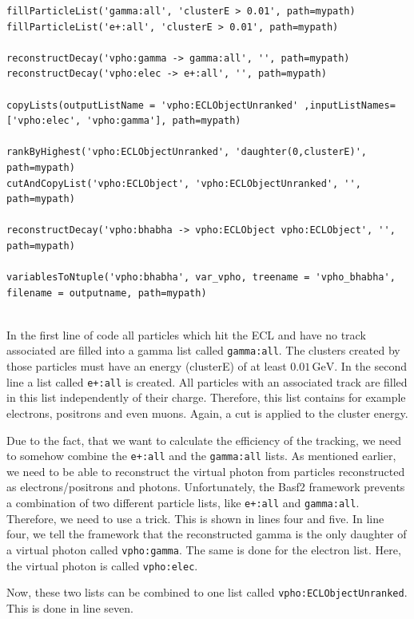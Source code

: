 \documentclass[a4paper,11pt,twosided,final,german,openbib,pdftex,listof=totoc,bibliography=totoc]{scrbook}
\begin{document}
{\small
\begin{lstlisting}
fillParticleList('gamma:all', 'clusterE > 0.01', path=mypath)
fillParticleList('e+:all', 'clusterE > 0.01', path=mypath)

reconstructDecay('vpho:gamma -> gamma:all', '', path=mypath)
reconstructDecay('vpho:elec -> e+:all', '', path=mypath)

copyLists(outputListName = 'vpho:ECLObjectUnranked' ,inputListNames=['vpho:elec', 'vpho:gamma'], path=mypath)

rankByHighest('vpho:ECLObjectUnranked', 'daughter(0,clusterE)', path=mypath)
cutAndCopyList('vpho:ECLObject', 'vpho:ECLObjectUnranked', '', path=mypath)
	
reconstructDecay('vpho:bhabha -> vpho:ECLObject vpho:ECLObject', '', path=mypath)

variablesToNtuple('vpho:bhabha', var_vpho, treename = 'vpho_bhabha', filename = outputname, path=mypath)
	
\end{lstlisting}
}
\bigskip

In the first line of code all particles which hit the ECL and have no track associated are filled into a gamma list called \texttt{gamma:all}. The clusters created by those particles must have an energy (clusterE) of at least $0.01\,\textrm{GeV}$. In the second line a list called \texttt{e+:all} is created. All particles with an associated track are filled in this list independently of their charge. Therefore, this list contains for example electrons, positrons and even muons. Again, a cut is applied to the cluster energy.


Due to the fact, that we want to calculate the efficiency of the tracking, we need to somehow combine the \texttt{e+:all} and the \texttt{gamma:all} lists. As mentioned earlier, we need to be able to reconstruct the virtual photon from particles reconstructed as electrons/positrons and photons.
Unfortunately, the Basf2 framework prevents a combination of two different particle lists, like \texttt{e+:all} and \texttt{gamma:all}. Therefore, we need to use a trick. This is shown in lines four and five. In line four, we tell the framework that the reconstructed gamma is the only daughter of a virtual photon called \texttt{vpho:gamma}. The same is done for the electron list. Here, the virtual photon is called \texttt{vpho:elec}. 

Now, these two lists can be combined to one list called \texttt{vpho:ECLObjectUnranked}. This is done in line seven.
\end{document}
